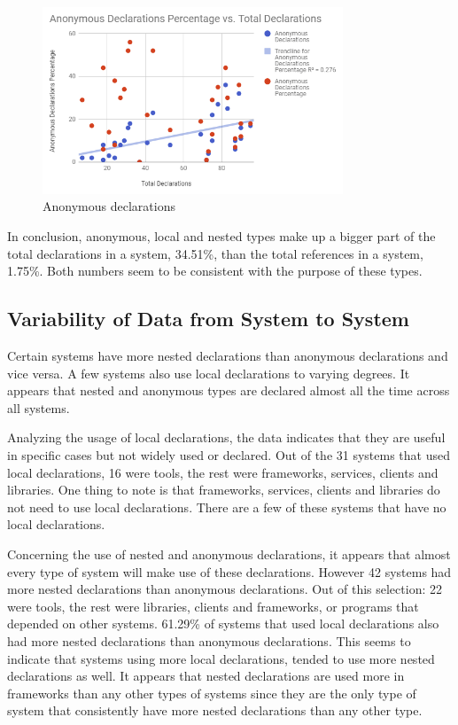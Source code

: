 \documentclass[12p]{article}
\begin{document}
\begin{figure}[H]
  \begin{center}
    \includegraphics[width=0.8\textwidth]{AnonPercent.PNG}
    \caption{Anonymous declarations}
    \label{fig:AnonPercent}
  \end{center}
\end{figure}

In conclusion, anonymous, local and nested types make up a bigger part of the total declarations in a system, 34.51\%, than the total references in a system, 1.75\%. Both numbers seem to be consistent with the purpose of these types.

\subsection{Variability of Data from System to System}

Certain systems have more nested declarations than anonymous declarations and vice versa. A few systems also use local declarations to varying degrees. It appears that nested and anonymous types are declared almost all the time across all systems.

Analyzing the usage of local declarations, the data indicates that they are useful in specific cases but not widely used or declared. Out of the 31 systems that used local declarations, 16 were tools, the rest were frameworks, services, clients and libraries. One thing to note is that frameworks, services, clients and libraries do not need to use local declarations. There are a few of these systems that have no local declarations.

Concerning the use of nested and anonymous declarations, it appears that almost every type of system will make use of these declarations. However 42 systems had more nested declarations than anonymous declarations. Out of this selection: 22 were tools, the rest were libraries, clients and frameworks, or programs that depended on other systems. 61.29\% of systems that used local declarations also had more nested declarations than anonymous declarations. This seems to indicate that systems using more local declarations, tended to use more nested declarations as well. It appears that nested declarations are used more in frameworks than any other types of systems since they are the only type of system that consistently have more nested declarations than any other type.
\end{document}
